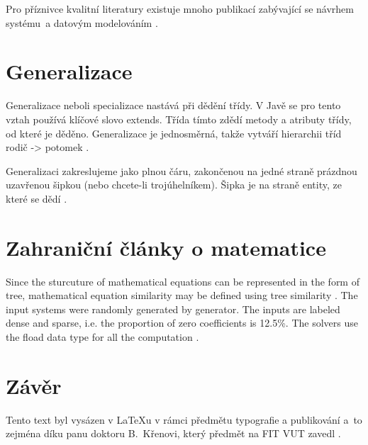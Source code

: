 \documentclass[11pt,a4paper,titlepage]{article}
\begin{document}
    Pro příznivce kvalitní literatury existuje mnoho publikací zabývající se návrhem systému~a
    datovým modelováním
    \cite{Merunka:Datove_modelovani}
    \cite{Lal:Graph_data_modeling}.


    \section{Generalizace}
    Generalizace neboli specializace nastává při dědění třídy. V Javě se pro tento vztah
    používá klíčové slovo extends. Třída tímto zdědí metody a atributy třídy, od které
    je děděno. Generalizace je jednosměrná, takže vytváří hierarchii tříd rodič -> potomek
    \cite{Bilek:Java_AST}.

    Generalizaci zakreslujeme jako plnou čáru, zakončenou na jedné straně prázdnou
    uzavřenou šipkou (nebo chcete-li trojúhelníkem). Šipka je na straně entity, ze které se dědí
    \cite{ITnetwork:Java_generalizace}.

    \section{Zahraniční články o matematice}
    Since the sturcuture of mathematical equations can be represented in the form of tree,
    mathematical equation similarity may be defined using tree similarity
    \cite{Clanek:Informatica}.
    The input systems were randomly generated by generator. The inputs are labeled
    dense and sparse, i.e. the proportion of zero coefficients is 12.5\%. The solvers use the
    fload data type for all the computation
    \cite{Clanek:CaI}.

    \section{Závěr}
    Tento text byl vysázen v \LaTeX u v rámci předmětu typografie a publikování a~to
    zejména díku panu doktoru B.~Křenovi, který předmět na FIT VUT zavedl
    \cite{Sbornik:PhD_Krena}.

    \newpage
    
\end{document}
